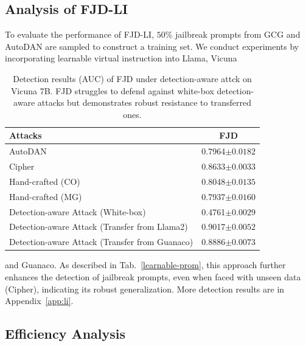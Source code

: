 \documentclass{article}
\begin{document}
\subsection{Analysis of FJD-LI}


To evaluate the performance of FJD-LI, $50\%$ jailbreak prompts from GCG and AutoDAN are sampled to construct a training set. We conduct experiments by incorporating learnable virtual instruction into Llama, Vicuna 

\begin{table}

    \centering
    \scriptsize
    \setlength\tabcolsep{8pt}
    \caption{Detection results (AUC) of FJD under detection-aware attck on Vicuna 7B. FJD struggles to defend against white-box detection-aware attacks but demonstrates robust resistance to transferred ones.} 
    \begin{tabular}{lc}
        \toprule
         \textbf{Attacks} & \textbf{FJD} \\
         \midrule
         AutoDAN &  0.7964\tiny{$\pm 0.0182$}    \\
         Cipher &   0.8633\tiny{$\pm 0.0033$}  \\
         Hand-crafted (CO) & 0.8048\tiny{$\pm 0.0135$}    \\
         Hand-crafted (MG) & 0.7937\tiny{$\pm 0.0160$}    \\
         \midrule
         Detection-aware Attack (White-box) &  0.4761\tiny{$\pm 0.0029$}   \\
         Detection-aware Attack (Transfer from Llama2) &  0.9017\tiny{$\pm 0.0052$}   \\
         Detection-aware Attack (Transfer from Guanaco) &  0.8886\tiny{$\pm 0.0073$}   \\
        \bottomrule
    \end{tabular}  
    \label{aware_attack}
    \vspace{-1cm}

\end{table}

and Guanaco. As described in Tab.~\ref{learnable-prom}, this approach further enhances the detection of jailbreak prompts, even when faced with unseen data (Cipher), indicating its robust generalization. More detection results are in Appendix~\ref{app:li}.




\subsection{Efficiency Analysis}
\end{document}
